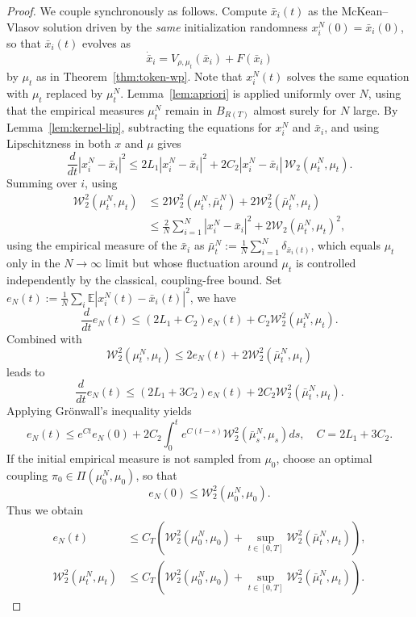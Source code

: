 \documentclass[11pt,a4wide]{article}
\theoremstyle{definition}
\newcommand{\Wass}{\mathcal{W}}
\begin{document}
\begin{proof}
We couple synchronously as follows. Compute  $\bar x_i(t)$ as the McKean--Vlasov solution driven by the \emph{same} initialization randomness $x_i^N(0)=\bar x_i(0)$, so that $\bar x_i(t)$ evolves as 
$$
\dot{\bar x}_i = V_{\rho,\mu_t}(\bar x_i)+F(\bar x_i)
$$
by $\mu_t$ as in Theorem~\ref{thm:token-wp}. Note that  $x_i^N(t)$ solves the same equation with $\mu_t$ replaced by $\mu_t^N$.  Lemma~\ref{lem:apriori} is applied uniformly over $N$, using that the empirical measures $\mu_t^N$ remain in $B_{R(T)}$ almost surely for $N$ large. By  Lemma~\ref{lem:kernel-lip}, subtracting the  equations for $x_i^N$ and $\bar x_i$, and using Lipschitzness in both $x$ and $\mu$ gives
\[
\frac{d}{dt}|x_i^N-\bar x_i|^2 \le 2L_1|x_i^N-\bar x_i|^2 + 2 C_2 |x_i^N-\bar x_i|\,\Wass_2(\mu_t^N,\mu_t).
\]
Summing over $i$, using 
\begin{align*}
\Wass_2^2 (\mu_t^N,\mu_t) & \le  2 \Wass_2^2 (\mu_t^N, \bar \mu_t^N) +  2 \Wass_2^2 ( \bar \mu_t^N,\mu_t) \\
& \le \tfrac 2 N\sum_{i=1}^N |x_i^N-\bar x_i|^2 + 2 \Wass_2(\bar \mu_t^N,\mu_t)^2, 
\end{align*}
using the empirical measure of the $\bar x_i$ as $\bar \mu_t^N:=\frac{1}{N}\sum_{i=1}^N \delta_{\bar x_i(t)}$,  which equals $\mu_t$ only in the $N\to\infty$ limit but whose fluctuation around $\mu_t$ is controlled independently by the classical, coupling-free bound. Set $e_N(t):=\tfrac1N\sum_i\mathbb E|x_i^N(t)-\bar x_i(t)|^2$, we have  
$$
\frac{d}{dt} e_N(t) \leq (2 L_1+C_2) e_N(t) + C_2 \Wass_2^2( \mu_t^N,\mu_t). 
$$
Combined with 
$$
\Wass_2^2( \mu_t^N,\mu_t) \leq 2e_N(t) + 2\Wass_2^2( \bar \mu_t^N,\mu_t) 
$$
leads to 
$$
\frac{d}{dt} e_N(t) \leq  (2L_1+ 3C_2)e_N(t) +2C_2 \Wass_2^2( \bar \mu_t^N,\mu_t). 
$$
Applying Gr\"onwall's inequality yields 
$$
e_N(t)\le e^{Ct}e_N(0) +2C_2\int_0^t e^{C(t-s)} \Wass_2^2( \bar \mu_s^N,\mu_s)ds, \quad C=2L_1+3C_2.
$$ 
If the initial empirical measure is not  sampled from $\mu_0$, 
choose an optimal coupling $\pi_0\in \Pi(\mu_0^N, \mu_0)$, so that 
$$
e_N(0)\leq \Wass_2^2( \mu_0^N,\mu_0).  
$$
Thus we obtain 
\begin{align*}
e_N(t) &  \leq C_T  \left( \Wass_2^2( \mu_0^N,\mu_0) +\sup_{t\in [0, T]} \Wass_2^2( \bar \mu_t^N,\mu_t)\right),\\ 
 \Wass_2^2( \mu_t^N,\mu_t)  & \leq C_T \left( \Wass_2^2( \mu_0^N,\mu_0) +\sup_{t\in [0, T]} \Wass_2^2( \bar \mu_t^N,\mu_t)\right).
\end{align*} 

\end{proof}
\end{document}
